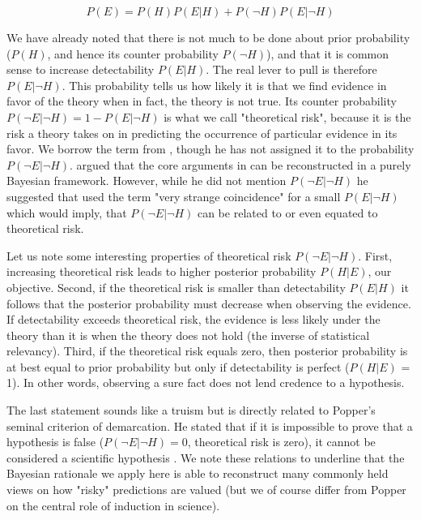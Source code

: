 \documentclass[jou,a4paper]{apa7}
\begin{document}
\begin{equation}
P(E) = P(H)P(E|H) + P(\neg{}H)P(E|\neg{}H) \label{eq:total-expectedness}
\end{equation}

We have already noted that there is not much to be done about prior probability ($P(H)$, and hence its counter probability $P(\neg{}H)$), and that it is common sense to increase detectability $P(E|H)$.
The real lever to pull is therefore $P(E|\neg{}H)$.
This probability tells us how likely it is that we find evidence in favor of the theory when in fact, the theory is not true.
Its counter probability $P(\neg{}E|\neg{}H)= 1 - P(E|\neg{}H)$ is what we call "theoretical risk", because it is the risk a theory takes on in predicting the occurrence of particular evidence in its favor.
We borrow the term from \textcite{meehlTheoreticalRisksTabular1978}, though he has not assigned it to the probability $P(\neg{}E|\neg{}H)$.
\textcite{kuklaClinicalStatisticalTheory1990} argued that the core arguments in \textcite{meehlAppraisingAmendingTheories1990} can be reconstructed in a purely Bayesian framework.
However, while he did not mention $P(\neg{}E|\neg{}H)$ he suggested that \textcite{meehlTheoreticalRisksTabular1978} used the term "very strange coincidence" for a small $P(E|\neg{}H)$ which would imply, that $P(\neg{}E|\neg{}H)$ can be related to or even equated to theoretical risk.\par
Let us note some interesting properties of theoretical risk $P(\neg{}E|\neg{}H)$.
First, increasing theoretical risk leads to higher posterior probability $P(H|E)$, our objective.
Second, if the theoretical risk is smaller than detectability $P(E|H)$ it follows that the posterior probability must decrease when observing the evidence.
If detectability exceeds theoretical risk, the evidence is less likely under the theory than it is when the theory does not hold (the inverse of statistical relevancy).
Third, if the theoretical risk equals zero, then posterior probability is at best equal to prior probability but only if detectability is perfect ($P(H|E)$ = 1).
In other words, observing a sure fact does not lend credence to a hypothesis.\par
The last statement sounds like a truism but is directly related to Popper's seminal criterion of demarcation.
He stated that if it is impossible to prove that a hypothesis is false ($P(\neg{}E|\neg{}H) = 0$, theoretical risk is zero), it cannot be considered a scientific hypothesis \parencite[][, p.18]{popperLogicScientificDiscovery2002}.
We note these relations to underline that the Bayesian rationale we apply here is able to reconstruct many commonly held views on how "risky" predictions are valued (but we of course differ from Popper on the central role of induction in science).\par
\end{document}
